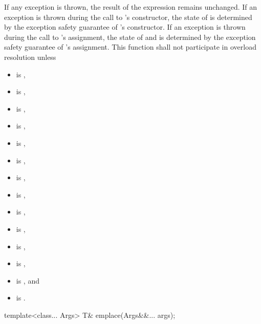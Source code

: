 \begin{itemdescr}
\pnum
\remarks
If any exception is thrown,
the result of the expression  remains unchanged.
If an exception is thrown during the call to 's constructor,
the state of  is determined by
the exception safety guarantee of 's constructor.
If an exception is thrown during the call to 's assignment,
the state of  and  is determined by
the exception safety guarantee of 's assignment.
This function shall not participate in overload resolution unless
\begin{itemize}
\item {} is ,
\item {} is ,
\item {} is ,
\item {} is ,
\item {} is ,
\item {} is ,
\item {} is ,
\item {} is ,
\item {} is ,
\item {} is ,
\item {} is ,
\item {} is ,
\item {} is , and
\item {} is .
\end{itemize}
\end{itemdescr}

%
\begin{itemdecl}
template<class... Args> T& emplace(Args&&... args);
\end{itemdecl}

